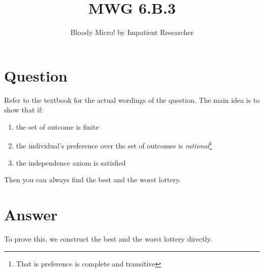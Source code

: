 \documentclass{tufte-handout}
\title{MWG 6.B.3}
\author{Bloody Micro! by Impatient Researcher}
\begin{document}
\maketitle%


\section{Question}\label{sec:question}

Refer to the textbook for the actual wordings of the question. The main idea is to show that if:

\begin{enumerate}
  \item the set of outcome is finite
  \item the individual's preference over the set of outcomes is \textit{rational}\footnote{That is preference is complete and transitive}
  \item the independence axiom is satisfied
\end{enumerate}

\noindent Then you can always find the best and the worst lottery.

\section{Answer}\label{sec:answer}

To prove this, we construct the best and the worst lottery directly.
\end{document}
